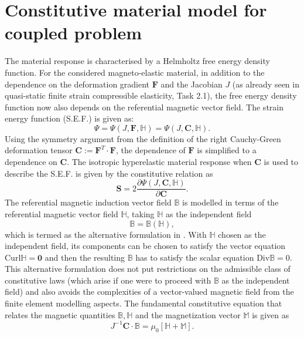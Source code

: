 \section{Constitutive material model for coupled problem}
The material response is characterised by a Helmholtz free energy density function. For the considered magneto-elastic material, in addition to the dependence on the deformation gradient $\mathbf{F}$ and the Jacobian $J$ (as already seen in quasi-static finite strain compressible elasticity, Task 2.1), the free energy density function now also depends on the referential magnetic vector field. The strain energy function (S.E.F.) is given as: 
\begin{equation}
\Psi = \Psi (J, \mathbf{F}, \mathbb{H}) = \Psi (J, \mathbf{C}, \mathbb{H}).
\label{eq:3.1}
\end{equation}
Using the symmetry argument from the definition of the right Cauchy-Green deformation tensor $\mathbf{C} := \mathbf{F}^T \cdot \mathbf{F}$, the dependence of $\mathbf{F}$ is simplified to a dependence on $\mathbf{C}$. The isotropic hyperelastic material response when $\mathbf{C}$ is used to describe the S.E.F. is given by the constitutive relation as
\begin{equation}
\mathbf{S} = 2 \dfrac{\partial \Psi (J, \mathbf{C}, \mathbb{H})}{\partial \mathbf{C}}.
\label{eq:3.2}
\end{equation}
The referential magnetic induction vector field $\mathbb{B}$ is modelled in terms of the referential magnetic vector field $\mathbb{H}$, taking $\mathbb{H}$ as the independent field
\begin{equation}
\mathbb{B} = \mathbb{B}(\mathbb{H}),
\label{eq:3.3}
\end{equation}
which is termed as the alternative formulation in \cite{dorfmann2004}. With $\mathbb{H}$ chosen as the independent field, its components can be chosen to satisfy the vector equation $\text{Curl} \mathbb{H} = \mathbf{0}$ and then the resulting $\mathbb{B}$ has to satisfy the scalar equation $\text{Div} \mathbb{B} = 0$. This alternative formulation does not put restrictions on the admissible class of constitutive laws (which arise if one were to proceed with $\mathbb{B}$ as the independent field) and also avoids the complexities of a vector-valued magnetic field from the finite element modelling aspects. The fundamental constitutive equation that relates the magnetic quantities $\mathbb{B}, \mathbb{H}$ and the magnetization vector $\mathbb{M}$ is given as \cite{dorfmann2004,dorfmann2005}
\begin{equation}
J^{-1} \mathbf{C} \cdot \mathbb{B} = \mu_0 \left[ \mathbb{H} + \mathbb{M} \right].
\label{eq:3.3.2}
\end{equation}
